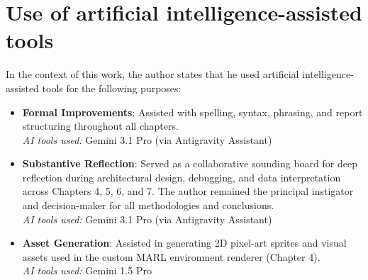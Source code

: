 \documentclass[11pt, a4paper]{article}
\begin{document}
\newpage

\begingroup
\setlength{\parskip}{0pt} %

\tableofcontents
\newpage

\listoftables 
\newpage

\listoffigures 
\newpage

\endgroup %

\setcounter{page}{1} 










\newpage
\printbibliography[title={Bibliography}]


\newpage

\section*{Use of artificial intelligence-assisted tools}

In the context of this work, the author states that he used artificial intelligence-assisted tools for the following purposes:

\begin{itemize}
    \item \textbf{Formal Improvements}: Assisted with spelling, syntax, phrasing, and report structuring throughout all chapters.\\
    \textit{AI tools used:} Gemini 3.1 Pro (via Antigravity Assistant)
    \item \textbf{Substantive Reflection}: Served as a collaborative sounding board for deep reflection during architectural design, debugging, and data interpretation across Chapters 4, 5, 6, and 7. The author remained the principal instigator and decision-maker for all methodologies and conclusions.\\
    \textit{AI tools used:} Gemini 3.1 Pro (via Antigravity Assistant)
    \item \textbf{Asset Generation}: Assisted in generating 2D pixel-art sprites and visual assets used in the custom MARL environment renderer (Chapter 4).\\
    \textit{AI tools used:} Gemini 1.5 Pro
\end{itemize}

\newpage

\end{document}
